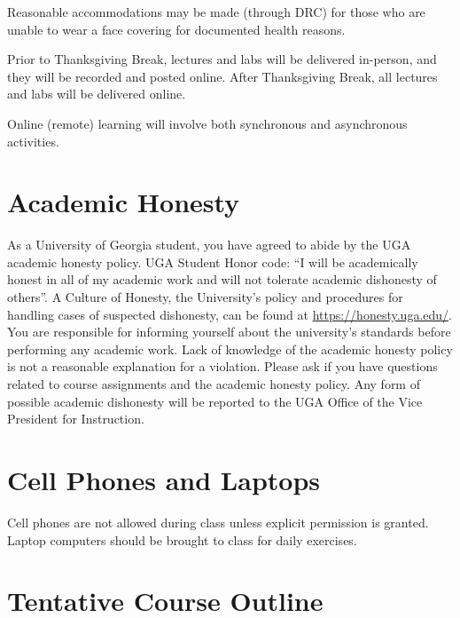 \documentclass[12pt]{article}
\begin{document}
Reasonable accommodations may be made (through DRC) for those who are
unable to wear a face covering for documented health reasons. 

Prior to Thanksgiving Break, lectures and labs will be delivered
in-person, and they will be recorded and posted online. After
Thanksgiving Break, all lectures and labs will be delivered online. 

Online (remote) learning will involve both synchronous and
asynchronous activities.

\vspace{-2mm}
\section*{\normalsize Academic Honesty}
\vspace{-4mm}
As a University of Georgia student, you have agreed to abide by the
UGA academic honesty policy. UGA Student Honor code: “I will be
academically honest in all of my academic work and will not tolerate
academic dishonesty of others”. A Culture of Honesty, the University's
policy and procedures for handling cases of suspected dishonesty, can
be found at \url{https://honesty.uga.edu/}. You are responsible for
informing yourself about the university’s standards before performing
any academic work. Lack of knowledge of the academic honesty policy is
not a reasonable explanation for a violation. Please ask if you have
questions related to course assignments and the academic honesty
policy. Any form of possible academic dishonesty will be reported to
the UGA Office of the Vice President for Instruction.


\vspace{-2mm}
\section*{\normalsize Cell Phones and Laptops}
\vspace{-4mm}
Cell phones are not allowed during class unless explicit permission is
granted. Laptop computers should be brought to class for daily
exercises.



\section*{\normalsize Tentative Course Outline}
\end{document}
